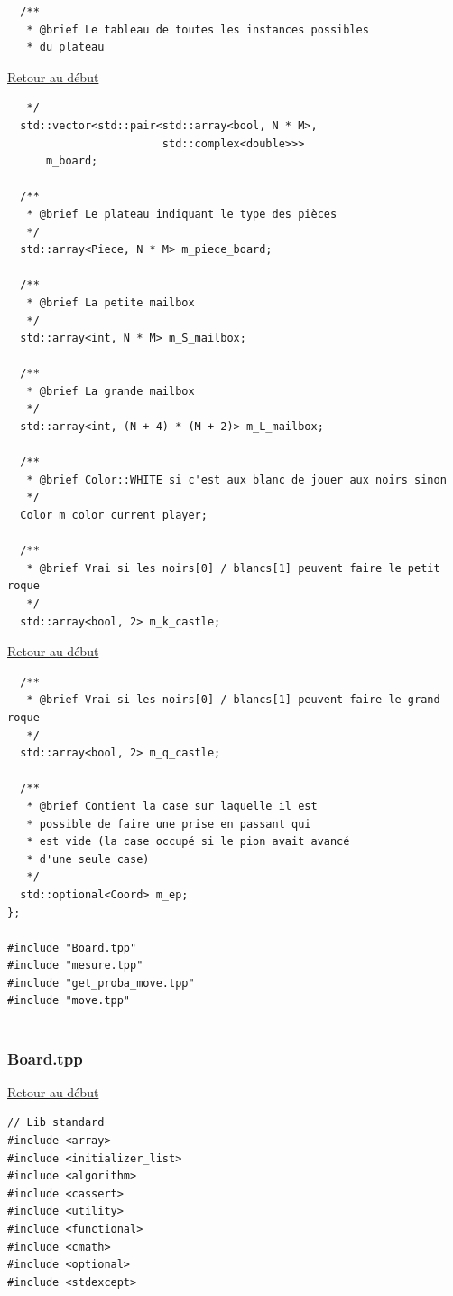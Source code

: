 {\begin{frame}[fragile]
\begin{verbatim}
  /**
   * @brief Le tableau de toutes les instances possibles
   * du plateau
\end{verbatim}
\end{frame}

\begin{frame}[fragile]
\hyperlink{conclusion}{Retour au début}\newline
\begin{verbatim}
   */
  std::vector<std::pair<std::array<bool, N * M>,
                        std::complex<double>>>
      m_board;

  /**
   * @brief Le plateau indiquant le type des pièces
   */
  std::array<Piece, N * M> m_piece_board;

  /**
   * @brief La petite mailbox
   */
  std::array<int, N * M> m_S_mailbox;

  /**
   * @brief La grande mailbox
   */
  std::array<int, (N + 4) * (M + 2)> m_L_mailbox;

  /**
   * @brief Color::WHITE si c'est aux blanc de jouer aux noirs sinon
   */
  Color m_color_current_player;

  /**
   * @brief Vrai si les noirs[0] / blancs[1] peuvent faire le petit roque
   */
  std::array<bool, 2> m_k_castle;

\end{verbatim}
\end{frame}

\begin{frame}[fragile]
\hyperlink{conclusion}{Retour au début}\newline
\begin{verbatim}
  /**
   * @brief Vrai si les noirs[0] / blancs[1] peuvent faire le grand roque
   */
  std::array<bool, 2> m_q_castle;

  /**
   * @brief Contient la case sur laquelle il est
   * possible de faire une prise en passant qui
   * est vide (la case occupé si le pion avait avancé
   * d'une seule case)
   */
  std::optional<Coord> m_ep;
};

#include "Board.tpp"
#include "mesure.tpp"
#include "get_proba_move.tpp"
#include "move.tpp"


\end{verbatim}
\end{frame}

\begin{frame}[fragile]
\label{Board.tpp}
\frametitle{Board.tpp}
\hyperlink{conclusion}{Retour au début}\newline
\begin{verbatim}
// Lib standard
#include <array>
#include <initializer_list>
#include <algorithm>
#include <cassert>
#include <utility>
#include <functional>
#include <cmath>
#include <optional>
#include <stdexcept>


\end{verbatim}
\end{frame}}
